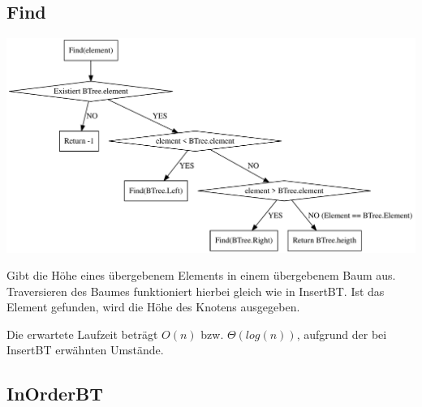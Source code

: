 \documentclass[11pt]{article}
\begin{document}
    \subsection{Find}

    \begin{center}
        \includegraphics[width=1.1\columnwidth] {find.pdf}
    \end{center}

    Gibt die Höhe eines übergebenem Elements in einem übergebenem Baum aus.
    Traversieren des Baumes funktioniert hierbei gleich wie in InsertBT.
    Ist das Element gefunden, wird die Höhe des Knotens ausgegeben.

    Die erwartete Laufzeit beträgt
    \begin{math}
        O(n)
    \end {math}
    bzw.
    \begin{math}
        \Theta (log (n))
    \end{math},
    aufgrund der bei InsertBT erwähnten Umstände.

    \subsection{InOrderBT}
\end{document}
